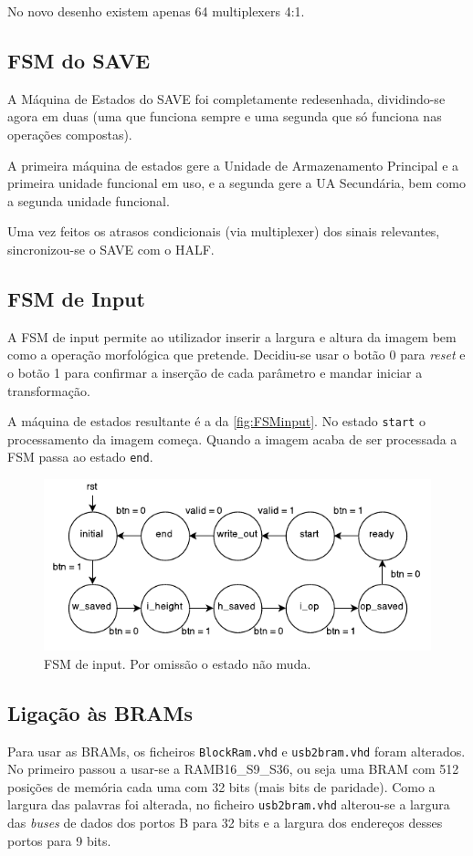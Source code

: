 \documentclass[a4paper]{article}
\begin{document}
No novo desenho existem apenas 64 multiplexers 4:1.


\subsection*{FSM do SAVE}

A Máquina de Estados do SAVE foi completamente redesenhada, dividindo-se agora em duas (uma que funciona sempre e uma segunda que só funciona nas operações compostas).

A primeira máquina de estados gere a Unidade de Armazenamento Principal e a primeira unidade funcional em uso, e a segunda gere a UA Secundária, bem como a segunda unidade funcional.

Uma vez feitos os atrasos condicionais (via multiplexer) dos sinais relevantes, sincronizou-se o SAVE com o HALF.

\subsection*{FSM de Input}

A FSM de input permite ao utilizador inserir a largura e altura da imagem bem como a operação morfológica que pretende. Decidiu-se usar o botão 0 para \textit{reset} e o botão 1 para confirmar a inserção de cada parâmetro e mandar iniciar a transformação.

A máquina de estados resultante é a da \autoref{fig:FSMinput}. No estado \texttt{start} o processamento da imagem começa. Quando a imagem acaba de ser processada a FSM passa ao estado \texttt{end}.

\begin{figure}
	\centering
	\includegraphics[width=.9\textwidth]{controlo_FSM}
	\caption{FSM de input. Por omissão o estado não muda.}
	\label{fig:FSMinput}
\end{figure}

\subsection*{Ligação às BRAMs}
Para usar as BRAMs, os ficheiros \texttt{BlockRam.vhd} e \texttt{usb2bram.vhd} foram alterados. No primeiro passou a usar-se a RAMB16\_S9\_S36, ou seja uma BRAM com 512 posições de memória cada uma com 32 bits (mais bits de paridade). Como a largura das palavras foi alterada, no ficheiro \texttt{usb2bram.vhd} alterou-se a largura das \textit{buses} de dados dos portos B para 32 bits e a largura dos endereços desses portos para 9 bits.
\end{document}
